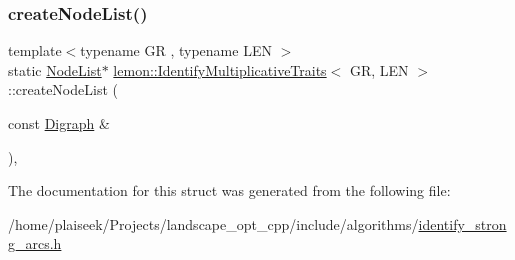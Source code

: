 \subsubsection{\texorpdfstring{create\+Node\+List()}{createNodeList()}}
{\footnotesize\ttfamily template$<$typename GR , typename L\+EN $>$ \\
static \hyperlink{structlemon_1_1_identify_multiplicative_traits_a686335471dfcb3c0b7baef1764679a66}{Node\+List}$\ast$ \hyperlink{structlemon_1_1_identify_multiplicative_traits}{lemon\+::\+Identify\+Multiplicative\+Traits}$<$ GR, L\+EN $>$\+::create\+Node\+List (\begin{DoxyParamCaption}\item[{const \hyperlink{structlemon_1_1_identify_multiplicative_traits_a586c2b69092471f155318915c7e5bdd0}{Digraph} \&}]{ }\end{DoxyParamCaption})\hspace{0.3cm}{\ttfamily [inline]}, {\ttfamily [static]}}



The documentation for this struct was generated from the following file\+:\begin{DoxyCompactItemize}
\item 
/home/plaiseek/\+Projects/landscape\+\_\+opt\+\_\+cpp/include/algorithms/\hyperlink{identify__strong__arcs_8h}{identify\+\_\+strong\+\_\+arcs.\+h}\end{DoxyCompactItemize}
